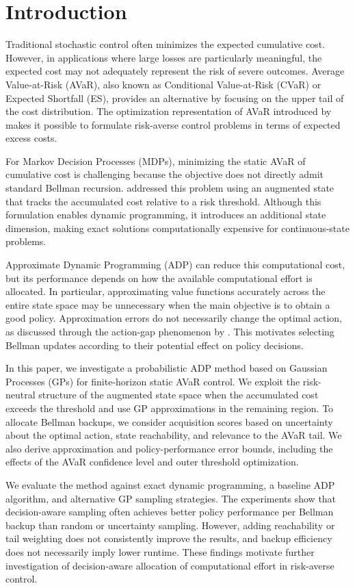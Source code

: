 \section{Introduction}
\label{sec:introduction}

Traditional stochastic control often minimizes the expected cumulative cost. However, in applications where large losses are particularly meaningful, the expected cost may not adequately represent the risk of severe outcomes. Average Value-at-Risk (AVaR), also known as Conditional Value-at-Risk (CVaR) or Expected Shortfall (ES), provides an alternative by focusing on the upper tail of the cost distribution. The optimization representation of AVaR introduced by \cite{rockafellar-2002} makes it possible to formulate risk-averse control problems in terms of expected excess costs.

For Markov Decision Processes (MDPs), minimizing the static AVaR of cumulative cost is challenging because the objective does not directly admit standard Bellman recursion. \cite{bauerle-2011} addressed this problem using an augmented state that tracks the accumulated cost relative to a risk threshold. Although this formulation enables dynamic programming, it introduces an additional state dimension, making exact solutions computationally expensive for continuous-state problems.

Approximate Dynamic Programming (ADP) can reduce this computational cost, but its performance depends on how the available computational effort is allocated. In particular, approximating value functions accurately across the entire state space may be unnecessary when the main objective is to obtain a good policy. Approximation errors do not necessarily change the optimal action, as discussed through the action-gap phenomenon by \cite{farahmand-2011}. This motivates selecting Bellman updates according to their potential effect on policy decisions.

In this paper, we investigate a probabilistic ADP method based on Gaussian Processes (GPs) for finite-horizon static AVaR control. We exploit the risk-neutral structure of the augmented state space when the accumulated cost exceeds the threshold and use GP approximations in the remaining region. To allocate Bellman backups, we consider acquisition scores based on uncertainty about the optimal action, state reachability, and relevance to the AVaR tail. We also derive approximation and policy-performance error bounds, including the effects of the AVaR confidence level and outer threshold optimization.

We evaluate the method against exact dynamic programming, a baseline ADP algorithm, and alternative GP sampling strategies. The experiments show that decision-aware sampling often achieves better policy performance per Bellman backup than random or uncertainty sampling. However, adding reachability or tail weighting does not consistently improve the results, and backup efficiency does not necessarily imply lower runtime. These findings motivate further investigation of decision-aware allocation of computational effort in risk-averse control.